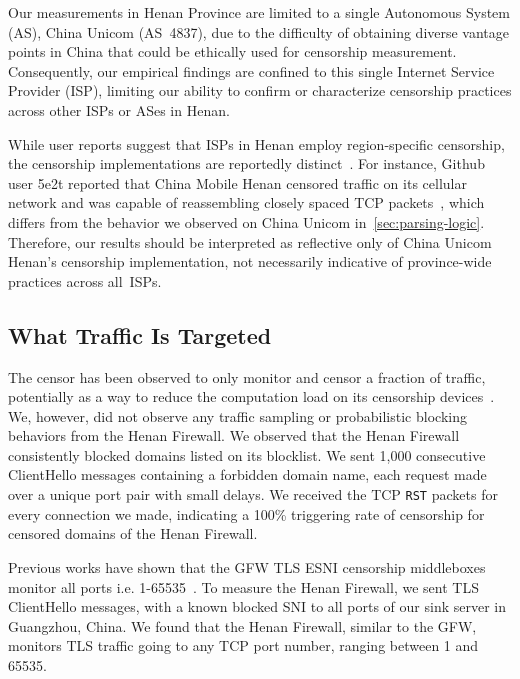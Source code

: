 \documentclass[conference,compsoc]{IEEEtran}
\begin{document}
Our measurements in Henan Province are limited to a single Autonomous System (AS),
China Unicom (AS~4837),
due to the difficulty of obtaining diverse vantage points in China
that could be ethically used for censorship measurement.
Consequently,
our empirical findings are confined to this single Internet Service Provider (ISP),
limiting our ability to confirm or characterize censorship practices across other ISPs or ASes in Henan.

While user reports suggest that
ISPs in Henan employ region-specific censorship,
the censorship implementations are reportedly distinct~\cite{Henan-user-report-1}.
For instance, Github user 5e2t reported that China Mobile Henan censored
traffic on its cellular network and was capable of reassembling closely spaced TCP packets~\cite{Henan-user-report-1},
which differs from the behavior we observed on China Unicom in~\autoref{sec:parsing-logic}.
Therefore, our results should be interpreted as reflective only of China Unicom Henan's censorship implementation,
not necessarily indicative of province-wide practices across all~ISPs.

\subsection{What Traffic Is Targeted}
\label{sec:what-targeted}

The censor has been observed to only monitor and censor a fraction of traffic,
potentially as a way to reduce the computation load on its censorship devices~\cite[\S 6.3]{Wu2023a}.
We, however, did not observe any traffic sampling
or probabilistic blocking behaviors from the Henan Firewall.
We observed that the Henan Firewall consistently blocked domains listed on its blocklist.
We sent 1,000 consecutive ClientHello messages containing a
forbidden domain name, each request made over a unique port pair with small delays.
We received the TCP \texttt{RST} packets for every connection we made,
indicating a 100\% triggering rate of censorship for censored domains of the Henan Firewall.

Previous works have shown that the GFW TLS ESNI censorship middleboxes monitor all ports i.e. 1-65535~\cite{Bock2020ESNI}.
To measure the Henan Firewall,
we sent TLS ClientHello messages,
with a known blocked SNI to all ports of our sink server in Guangzhou, China.
We found that the Henan Firewall, similar to the GFW, monitors TLS traffic going to any TCP port number, ranging between 1 and 65535.
\end{document}
